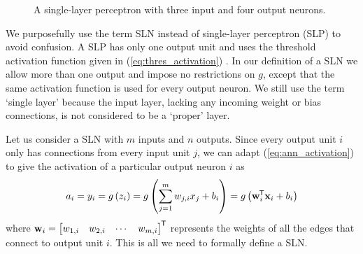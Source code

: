 \begin{figure}
    \begin{center}
    \end{center}
    \caption{A single-layer perceptron with three input and four output neurons.}
    \label{fig:single_layer_perceptron}
\end{figure}

We purposefully use the term SLN instead of single-layer perceptron (SLP) to avoid confusion. 
A SLP has only one output unit and uses the threshold activation function given in (\ref{eq:thres_activation}) \cite{rosenblatt1958}.
In our definition of a SLN we allow more than one output and impose no restrictions on $g$, except that the same activation function is used for every output neuron.
We still use the term `single layer' because the input layer, lacking any incoming weight or bias connections, is not considered to be a `proper' layer.

Let us consider a SLN with $m$ inputs and $n$ outputs. 
Since every output unit $i$ only has connections from every input unit $j$,
we can adapt (\ref{eq:ann_activation}) to give the activation of a particular output neuron $i$ as
\begin{equation}
    a_i = y_i = g\left(z_i\right) = g\left(\sum_{j=1}^m{w_{j,i} x_j} + b_i\right)
    = g\left( \mathbf{w}_i^{\mkern-1.5mu\mathsf{T}} \mathbf{x}_i + b_i\right)
\end{equation}
where
$
    \mathbf{w}_i = \begin{bmatrix}
        w_{1,i} & w_{2,i} & \cdots & w_{m,i}
    \end{bmatrix}^{\mkern-1.5mu\mathsf{T}}
$
represents the weights of all the edges that connect to output unit $i$.
This is all we need to formally define a SLN.

